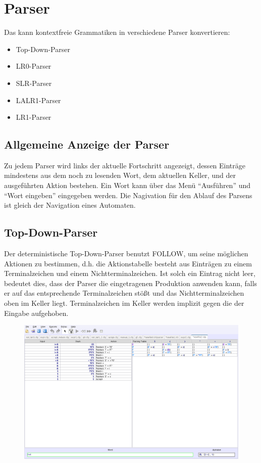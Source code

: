 

\chapter{Parser}

Das \gtitool kann kontextfreie Grammatiken in verschiedene Parser konvertieren:
\begin{itemize}
\item Top-Down-Parser
\item LR0-Parser
\item SLR-Parser
\item LALR1-Parser
\item LR1-Parser
\end{itemize}

\section{Allgemeine Anzeige der Parser}
Zu jedem Parser wird links der aktuelle Fortschritt angezeigt, dessen Einträge
mindestens aus dem noch zu lesenden Wort, dem aktuellen Keller, und der
ausgeführten Aktion bestehen.
Ein Wort kann über das Menü "`Ausführen"' und "`Wort eingeben"' eingegeben werden. 
Die Nagivation für den Ablauf des Parsens ist gleich der Navigation eines Automaten.

\section{Top-Down-Parser}

Der deterministische Top-Down-Parser benutzt FOLLOW,
um seine möglichen Aktionen zu bestimmen, d.h. die Aktionstabelle besteht
aus Einträgen zu einem Terminalzeichen und einem Nichtterminalzeichen.
Ist solch ein Eintrag nicht leer, bedeutet dies, dass der Parser
die eingetragenen Produktion anwenden kann, falls er auf das entsprechende
Terminalzeichen stößt und das Nichtterminalzeichen oben im Keller liegt.
Terminalzeichen im Keller werden implizit gegen die der Eingabe aufgehoben.

\begin{figure}[h]
\begin{center}
\includegraphics[width=12cm]{../images/tdp.png}
\end{center}
\end{figure}

